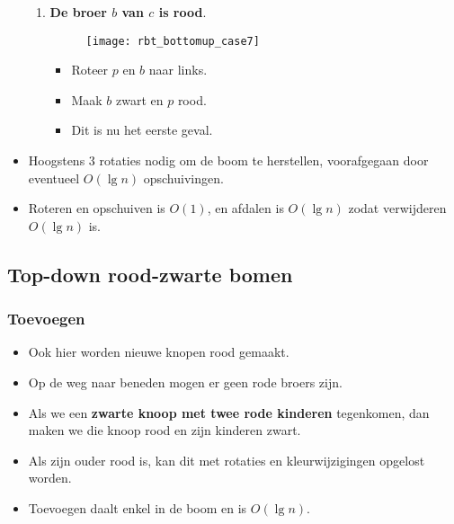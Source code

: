 \begin{itemize}
\begin{enumerate}
        \item \textbf{De broer $b$ van $c$ is rood}.
        \begin{figure}[ht]
            \centering
            \texttt{[image: rbt\_bottomup\_case7]}
            \caption{}
            \label{fig:rbt_bottomup_case7}
        \end{figure}
        \begin{itemize}
            \item Roteer $p$ en $b$ naar links.
            \item Maak $b$ zwart en $p$ rood.
            \item Dit is nu het eerste geval.
        \end{itemize}
    \end{enumerate}
    \item Hoogstens 3 rotaties nodig om de boom te herstellen, voorafgegaan door eventueel $O(\lg n)$ opschuivingen.
    \item Roteren en opschuiven is $O(1)$, en afdalen is $O(\lg n)$ zodat verwijderen $O(\lg n)$ is.
\end{itemize}


\subsection{Top-down rood-zwarte bomen}
\subsubsection{Toevoegen}
\begin{itemize}
    \item Ook hier worden nieuwe knopen rood gemaakt.
    \item Op de weg naar beneden mogen er geen rode broers zijn.
    \item Als we een \textbf{zwarte knoop met twee rode kinderen} tegenkomen, dan maken we die knoop rood en zijn kinderen zwart.
    \item Als zijn ouder rood is, kan dit met rotaties en kleurwijzigingen opgelost worden.
    \item Toevoegen daalt enkel in de boom en is $O(\lg n)$.
\end{itemize}

